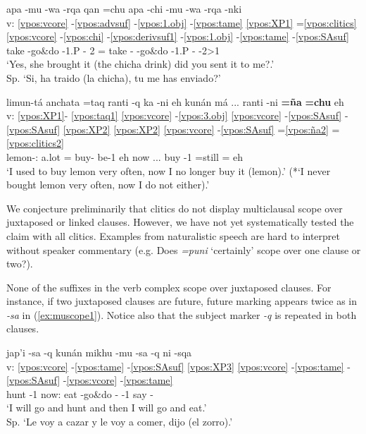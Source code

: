 \documentclass[output=paper]{langscibook}
\begin{document}
\ea \label{ex:cliticnoscope1}
    \glll{} apa -mu -wa -rqa   qan =chu apa -chi -mu -wa -rqa -nki \\
    v: \ref{vpos:vcore} -\ref{vpos:advsuf} -\ref{vpos:1.obj} -\ref{vpos:tame} \ref{vpos:XP1} =\ref{vpos:clitics} \ref{vpos:vcore} -\ref{vpos:chi} -\ref{vpos:derivsuf1} -\ref{vpos:1.obj} -\ref{vpos:tame} -\ref{vpos:SAsuf} \\
    {} take -go\&do -1.P -\Pst{} 2\Sg{} =\Inter{} take -\Caus{} -go\&do -1.P -\Pst{} -2\Sg{}>1\Sg{}  \\
    \glt `Yes, she brought it (the chicha drink) did you sent it to me?.' \\ Sp. `Si, ha traido (la chicha), tu me has enviado?' 
\z 

\ea \label{ex:cliticnoscope2}{
	\glll {} limun-tá anchata =taq ranti -q ka -ni eh kunán má ... ranti -ni \textbf{=ña} \textbf{=chu} eh  \\
    v: \ref{vpos:XP1}- \ref{vpos:taq1} \ref{vpos:vcore} -\ref{vpos:3.obj} \ref{vpos:vcore} -\ref{vpos:SAsuf} -\ref{vpos:SAsuf} \ref{vpos:XP2} \ref{vpos:XP2} \ref{vpos:vcore} -\ref{vpos:SAsuf} =\ref{vpos:ña2} =\ref{vpos:clitics2}      \\
    {} lemon-\Acc{}:\Top{} a.lot =\Conj{} buy-\Nmlz{} be-1\Sg{} eh now \Neg{} ... buy -1\Sg{} =still =\Neg{} eh  \\
	\glt `I used to buy lemon very often, now I no longer buy it (lemon).' (*`I never bought lemon very often, now I do not either).' \hfill } 
\z

We conjecture preliminarily that clitics do not display multiclausal scope over juxtaposed or linked clauses. However, we have not yet systematically tested the claim with all clitics. Examples from naturalistic speech are hard to interpret without speaker commentary (e.g. Does \textit{=puni} `certainly' scope over one clause or two?). 

None of the suffixes in the verb complex scope over juxtaposed clauses. For instance, if two juxtaposed clauses are future, future marking appears twice as in \textit{-sa} in (\ref{ex:muscope1}). Notice also that the subject marker \textit{-q} is repeated in both clauses. 

\ea \label{ex:muscope1}
   \glll {} jap'i -sa -q kunán mikhu -mu -sa -q ni -sqa   \\
   v: \ref{vpos:vcore} -\ref{vpos:tame} -\ref{vpos:SAsuf} \ref{vpos:XP3} \ref{vpos:vcore} -\ref{vpos:tame} -\ref{vpos:SAsuf} -\ref{vpos:vcore} -\ref{vpos:tame} \\
   {} hunt \Fut{} -1\Sg{} now:\Top{} eat -go\&do -\Fut{} -1\Sg{} say -\Gerund{}  \\
   \glt `I will go and hunt and then I will go and eat.' \\  Sp. ‘Le voy a cazar y le voy a comer, dijo (el zorro).'
\z 
\end{document}

